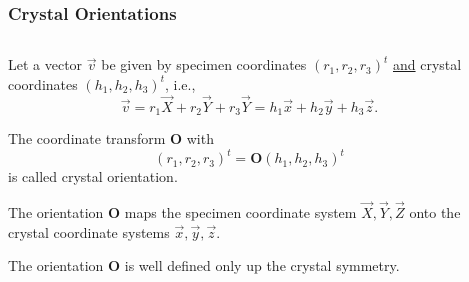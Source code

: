\documentclass[compress]{beamer}
\begin{document}
\begin{frame}
  \frametitle{Crystal Orientations}

  \begin{columns}

    \begin{column}{6.3cm}

      \begin{overlayarea}{6.4cm}{8cm}
        Let a vector $\vec v$ be given by specimen coordinates
        $(r_{1},r_{2},r_{3})^{t}$ \underline{and} crystal coordinates
        $(h_{1},h_{2},h_{3})^{t}$, i.e.,
        \begin{equation*}
          \vec v = r_{1} \vec X + r_{2} \vec Y + r_{3} \vec Y
                 = h_{1} \vec x + h_{2} \vec y + h_{3} \vec z.
        \end{equation*}

        \pause

        The coordinate transform $\mathbf O$ with
      \begin{equation*}
        \left(r_{1},r_{2},r_{3}\right)^{t}
        =
         \mathbf O
         \left(
          h_{1},h_{2},h_{3} \right)^{t}
      \end{equation*}
      is called \alert{crystal orientation}.

      \pause
      \medskip

      The orientation $\mathbf O$ maps the specimen coordinate system $\vec X,
      \vec Y, \vec Z$ onto the crystal coordinate systems $\vec x, \vec y,
      \vec z$.

      \pause
      \medskip

      The orientation $\mathbf O$ is well defined only up the crystal
      symmetry.

    \end{overlayarea}
  \end{column}

    \begin{column}{5cm}

\end{column}
\end{columns}
\end{frame}
\end{document}
